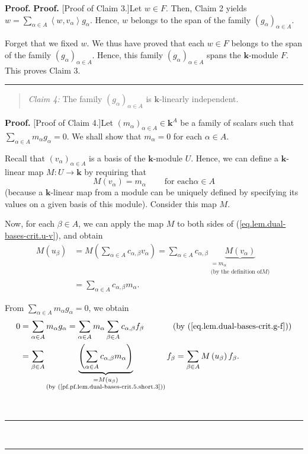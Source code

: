 \documentclass[numbers=enddot,12pt,final,onecolumn,notitlepage]{scrartcl}%
\theoremstyle{definition}
\newenvironment{statement}{\begin{quote}}{\end{quote}}
\newenvironment{proof}[1][Proof]{\noindent\textbf{#1.} }{\ \rule{0.5em}{0.5em}}
\let\sumnonlimits\sum
\renewcommand{\sum}{\sumnonlimits\limits}
\newenvironment{vershort}{}{}
\begin{document}
\begin{proof}
\begin{proof}
[Proof of Claim 3.]Let $w\in F$. Then, Claim 2 yields $w=\sum_{\alpha\in
A}\left\langle w,v_{\alpha}\right\rangle g_{\alpha}$. Hence, $w$ belongs to
the span of the family $\left(  g_{\alpha}\right)  _{\alpha\in A}$.

Forget that we fixed $w$. We thus have proved that each $w\in F$ belongs to
the span of the family $\left(  g_{\alpha}\right)  _{\alpha\in A}$. Hence,
this family $\left(  g_{\alpha}\right)  _{\alpha\in A}$ spans the $\mathbf{k}%
$-module $F$. This proves Claim 3.
\end{proof}

\begin{statement}
\textit{Claim 4:} The family $\left(  g_{\alpha}\right)  _{\alpha\in A}$ is
$\mathbf{k}$-linearly independent.
\end{statement}

\begin{proof}
[Proof of Claim 4.]Let $\left(  m_{\alpha}\right)  _{\alpha\in A}\in
\mathbf{k}^{A}$ be a family of scalars such that $\sum_{\alpha\in A}m_{\alpha
}g_{\alpha}=0$. We shall show that $m_{\alpha}=0$ for each $\alpha\in A$.

Recall that $\left(  v_{\alpha}\right)  _{\alpha\in A}$ is a basis of the
$\mathbf{k}$-module $U$. Hence, we can define a $\mathbf{k}$-linear map
$M:U\rightarrow\mathbf{k}$ by requiring that%
\[
M\left(  v_{\alpha}\right)  =m_{\alpha}\ \ \ \ \ \ \ \ \ \ \text{for each
}\alpha\in A
\]
(because a $\mathbf{k}$-linear map from a module can be uniquely defined by
specifying its values on a given basis of this module). Consider this map $M$.

\begin{vershort}
Now, for each $\beta\in A$, we can apply the map $M$ to both sides of
(\ref{eq.lem.dual-bases-crit.u-v}), and obtain%
\begin{align}
M\left(  u_{\beta}\right)   &  =M\left(  \sum_{\alpha\in A}c_{\alpha,\beta
}v_{\alpha}\right)  =\sum_{\alpha\in A}c_{\alpha,\beta}\underbrace{M\left(
v_{\alpha}\right)  }_{\substack{=m_{\alpha}\\\text{(by the definition of
}M\text{)}}}\nonumber\\
&  =\sum_{\alpha\in A}c_{\alpha,\beta}m_{\alpha}.
\label{pf.pf.lem.dual-bases-crit.5.short.3}%
\end{align}


From $\sum_{\alpha\in A}m_{\alpha}g_{\alpha}=0$, we obtain%
\begin{align*}
0  &  =\sum_{\alpha\in A}m_{\alpha}g_{\alpha}=\sum_{\alpha\in A}m_{\alpha}%
\sum_{\beta\in A}c_{\alpha,\beta}f_{\beta}\ \ \ \ \ \ \ \ \ \ \left(  \text{by
(\ref{eq.lem.dual-bases-crit.g-f})}\right) \\
&  =\sum_{\beta\in A}\underbrace{\left(  \sum_{\alpha\in A}c_{\alpha,\beta
}m_{\alpha}\right)  }_{\substack{=M\left(  u_{\beta}\right)  \\\text{(by
(\ref{pf.pf.lem.dual-bases-crit.5.short.3}))}}}f_{\beta}=\sum_{\beta\in
A}M\left(  u_{\beta}\right)  f_{\beta}.
\end{align*}


\end{vershort}
\end{proof}
\end{proof}
\end{document}
